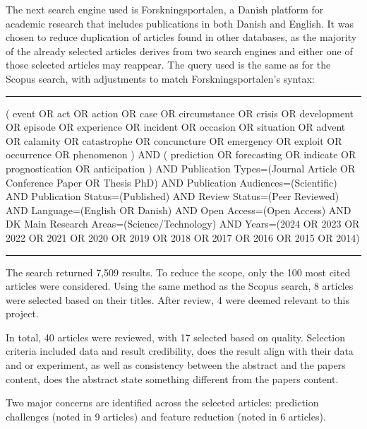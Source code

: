 	The next search engine used is Forskningsportalen, a Danish platform for academic research that includes publications in both Danish and English. It was chosen to reduce duplication of articles found in other databases, as the majority of the already selected articles derives from two search engines and either one of those selected articles may reappear. The query used is the same as for the Scopus search, with adjustments to match Forskningsportalen’s syntax:
	\newline\noindent\rule{\textwidth}{0.2pt}\newline
	\noindent
	\vspace{.2cm}
	( event OR act OR action OR case OR circumstance OR crisis OR development OR episode OR experience OR incident OR occasion OR situation OR advent OR calamity OR catastrophe OR concuncture OR emergency OR exploit OR occurrence OR phenomenon ) AND ( prediction OR forecasting OR indicate OR prognostication OR anticipation ) AND Publication Types=(Journal Article OR Conference Paper OR Thesis PhD) AND Publication Audiences=(Scientific) AND	Publication Status=(Published) AND	Review Status=(Peer Reviewed) AND Language=(English OR Danish) AND	Open Access=(Open Access) AND DK Main Research Areas=(Science/Technology) AND Years=(2024 OR 2023 OR 2022 OR 2021 OR 2020 OR 2019 OR 2018 OR 2017 OR 2016 OR 2015 OR 2014)
	\vspace{.2cm}
	\newline\noindent\rule{\textwidth}{0.4pt}\newline
	\vspace{.1cm}
	
	The search returned 7,509 results. To reduce the scope, only the 100 most cited articles were considered. Using the same method as the Scopus search, 8 articles were selected based on their titles. After review, 4 were deemed relevant to this project.
	
	
	In total, 40 articles were reviewed, with 17 selected based on quality. Selection criteria included data and result credibility, does the result align with their data and or experiment, as well as consistency between the abstract and the papers content, does the abstract state something different from the papers content.
	
	Two major concerns are identified across the selected articles: prediction challenges (noted in 9 articles) and feature reduction (noted in 6 articles).
	
